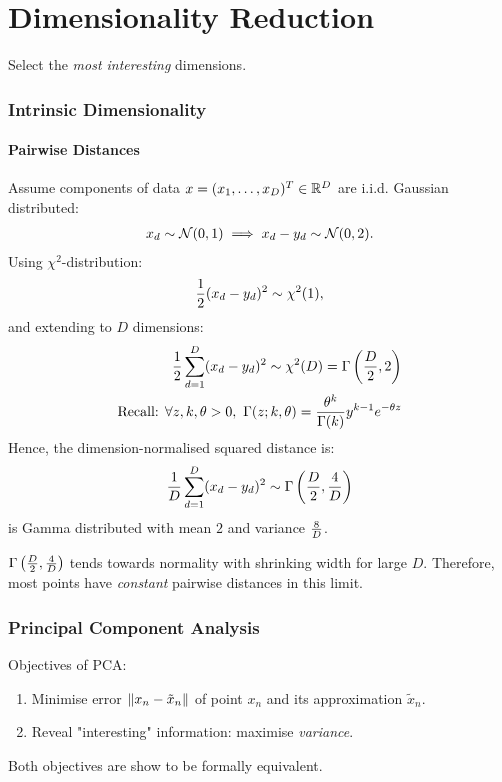 \newpage
\part{Dimensionality Reduction}
Select the \emph{most interesting} dimensions. 

\section{Intrinsic Dimensionality}
\subsection*{Pairwise Distances}
Assume components of data $x=(x_1,\ldots,x_D)^T \in \mathbb{R}^D$ are i.i.d. Gaussian distributed:
\begin{align*}
    x_d \sim \mathcal N(0,1) \implies x_d - y_d \sim \mathcal N(0,2).
\end{align*}
Using $\chi^2$-distribution:
\begin{align*}
    {1\over 2}(x_d-y_d)^2 \sim \chi^2(1),
\end{align*}
and extending to $D$ dimensions:
\begin{align*}
    {1\over 2} \sum_{d=1}^D (x_d-y_d)^2 \sim \chi^2(D) = \Gamma\left( {D\over 2}, 2\right)\\
    \text{Recall: } \forall z,k, \theta > 0,\ \Gamma(z;k,\theta) = {\theta^k\over \Gamma(k)} y^{k-1} e^{-\theta z} 
\end{align*}
Hence, the dimension-normalised squared distance is:
\begin{align*}
    {1\over D} \sum_{d=1}^D (x_d-y_d)^2 \sim \Gamma\left({D\over 2}, {4\over D}\right)
\end{align*}
is Gamma distributed with mean $2$ and variance ${8 \over D}$. 

$\Gamma\left({D\over 2}, {4\over D}\right)$  tends towards normality with shrinking width for large $D$. Therefore, most points have \emph{constant} pairwise distances in this limit.

\section{Principal Component Analysis}
Objectives of PCA:
\begin{enumerate}
\item Minimise error $\left\lVert x_n-\tilde{x}_n\right\rVert$ of point $x_n$ and its approximation $\tilde x_n$.
\item Reveal "interesting" information: maximise \emph{variance}.
\end{enumerate}
Both objectives are show to be formally equivalent.

